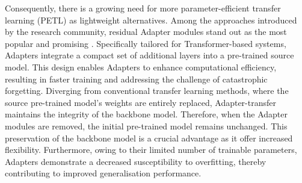 Consequently, there is a growing need for more parameter-efficient transfer learning (PETL) as lightweight alternatives.
 Among the approaches introduced by the research community, residual Adapter modules stand out as the most popular and promising \cite{houlsby, pfeiffer}. Specifically tailored for Transformer-based systems, Adapters integrate a compact set of additional layers into a pre-trained source model. This design enables Adapters to enhance computational efficiency, resulting in faster training and addressing the challenge of catastrophic forgetting. Diverging from conventional transfer learning methods, where the source pre-trained model's weights are entirely replaced, Adapter-transfer maintains the integrity of the backbone model. Therefore, when the Adapter modules are removed, the initial pre-trained model remains unchanged. This preservation of the backbone model is a crucial advantage  as it offer increased flexibility. Furthermore, owing to their limited number of trainable parameters, Adapters demonstrate a decreased susceptibility to overfitting, thereby contributing to improved generalisation performance.


